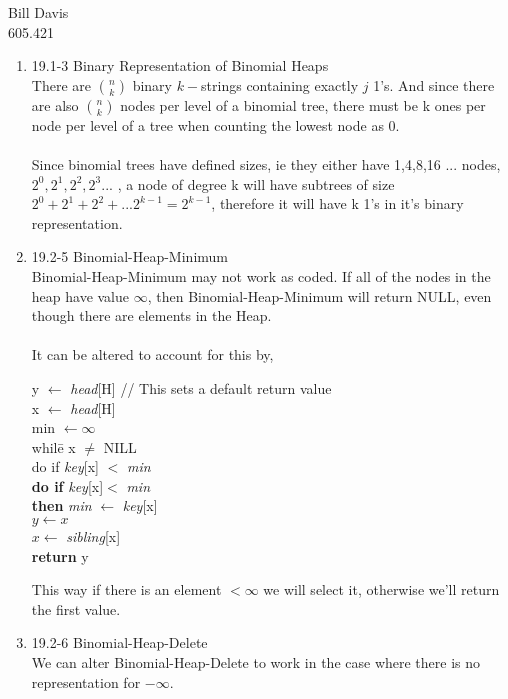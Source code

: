 \documentclass[11pt,fleqn]{article}
\begin{document}
\newcommand{\mbf}[1]{\mbox{{\bfseries #1}}}
\newcommand{\N}{\mbf{N}}
\renewcommand{\O}{\mbf{O}}

\noindent Bill Davis \\
605.421 

\begin{enumerate}
\item 19.1-3 Binary Representation of Binomial Heaps \\
There are $n\choose k$ binary $k-$strings containing exactly $j$ 1's. And since there are also $n\choose k$ nodes per level of a binomial tree, there must be k ones per node per level of a tree when counting the lowest node as 0. \\
\\
Since binomial trees have defined sizes, ie they either have 1,4,8,16 ... nodes,  $2^{0}, 2^{1}, 2^{2}, 2^{3} ...$ , a node of degree k will have subtrees of size $2^{0} + 2^{1} +  2^{2} + ... 2^{k-1} = 2^{k-1}$, therefore it will have k 1's in it's binary representation. 
\item 19.2-5 Binomial-Heap-Minimum \\
Binomial-Heap-Minimum may not work as coded. If all of the nodes in the heap have value $\infty$, then Binomial-Heap-Minimum will return NULL, even though there are elements in the Heap. \\
\\
It can be altered to account for this by, 
\begin{tabbing}
	y $\leftarrow$ \emph{head}[H] // This sets a default return value \\
	x $\leftarrow$ \emph{head}[H]\\ 
	min $\leftarrow \infty$ \\
	whil\=e x $\neq$ NILL \\
	\> do if \= \emph{key}[x] $<$ \emph{min}\\
	\> \> \textbf{do if }\=  \emph{key}[x]$<$ \emph{min} \\
	\> \> \>\textbf{then} \= \emph{min} $\leftarrow$ \emph{key}[x] \\
   \> \> \> \>$y \leftarrow x$ \\
 	\> \> $x \leftarrow$ \emph{sibling}[x] \\
	\textbf{return} y \\
\end{tabbing}
This way if there is an element $< \infty$ we will select it, otherwise we'll return the first value. 

\item 19.2-6 Binomial-Heap-Delete \\
We can alter Binomial-Heap-Delete to work in the case where there is no representation for $-\infty$. \\


\end{enumerate}
\end{document}
